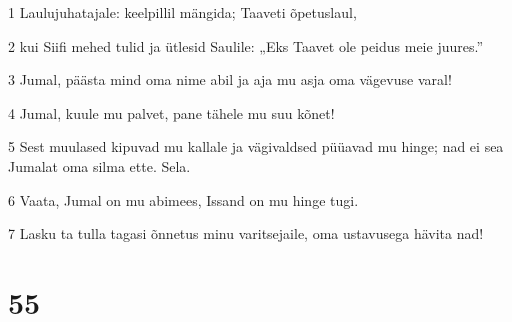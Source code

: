 \par 1 Laulujuhatajale: keelpillil mängida; Taaveti õpetuslaul,
\par 2 kui Siifi mehed tulid ja ütlesid Saulile: „Eks Taavet ole peidus meie juures.”
\par 3 Jumal, päästa mind oma nime abil ja aja mu asja oma vägevuse varal!
\par 4 Jumal, kuule mu palvet, pane tähele mu suu kõnet!
\par 5 Sest muulased kipuvad mu kallale ja vägivaldsed püüavad mu hinge; nad ei sea Jumalat oma silma ette. Sela.
\par 6 Vaata, Jumal on mu abimees, Issand on mu hinge tugi.
\par 7 Lasku ta tulla tagasi õnnetus minu varitsejaile, oma ustavusega hävita nad!

\chapter{55}

